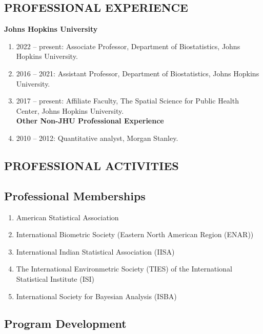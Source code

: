 \documentclass[12pt]{article}
\newcommand{\mydot}[1]{\begin{enumerate}[label=$\circ$,leftmargin=\parindent]\setlength{\itemsep}{#1}}
\newcommand{\ee}{\end{enumerate}}
\newcommand{\mylift}[1]{\vspace*{#1}}
\begin{document}


\subsection*{PROFESSIONAL EXPERIENCE}

\noindent \textbf{Johns Hopkins University}
\mydot{-0.1em}

\item \vskip -3mm
2022 -- present: Associate Professor, Department of Biostatistics, Johns Hopkins University.
\item 2016 -- 2021: Assistant Professor, Department of Biostatistics, Johns Hopkins University.
\item 2017 -- present: Affiliate Faculty, The Spatial Science for Public Health Center, Johns Hopkins University.\\ 
\vskip 2mm \noindent \textbf{Other Non-JHU Professional Experience}
\item 2010 -- 2012: Quantitative analyst, Morgan Stanley.

\ee

\subsection*{PROFESSIONAL ACTIVITIES}

\smallskip

\subsection*{Professional Memberships}

\mydot{-0.1em}

\item American Statistical Association
\item International Biometric Society (Eastern North American Region (ENAR))
\item International Indian Statistical Association (IISA)
\item The International Environmetric Society (TIES) of the International Statistical Institute (ISI) 
\item International Society for Bayesian Analysis (ISBA)

\ee

\mylift{-1.5em}

\subsection*{Program Development}
\end{document}
